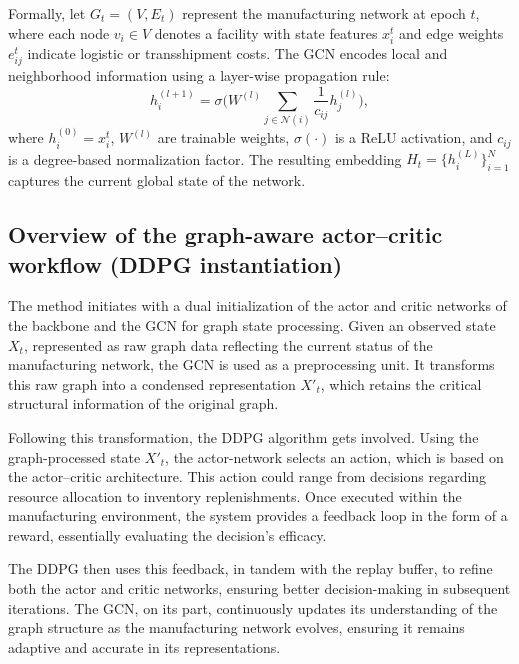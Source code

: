 \documentclass[preprint,review,12pt,nonatbib]{elsarticle}
\providecommand{\DIFadd}[1]{{\protect\color{blue}#1}} %
\providecommand{\DIFdel}[1]{} %
\providecommand{\DIFaddbegin}{} %
\providecommand{\DIFaddend}{} %
\providecommand{\DIFdelbegin}{} %
\providecommand{\DIFdelend}{} %
\providecommand{\DIFscaledelfig}{0.5}
\newlength{\DIFdelgraphicswidth} %
\newlength{\DIFdelgraphicsheight} %
\providecommand{\DIFaddincludegraphics}[2][]{{\color{blue}\fbox{\DIFOincludegraphics[#1]{#2}}}} %
\providecommand{\DIFdelincludegraphics}[2][]{%
\sbox{\DIFdelgraphicsbox}{\DIFOincludegraphics[#1]{#2}}%
\settoboxwidth{\DIFdelgraphicswidth}{\DIFdelgraphicsbox} %
\settoboxtotalheight{\DIFdelgraphicsheight}{\DIFdelgraphicsbox} %
\scalebox{\DIFscaledelfig}{%
\parbox[b]{\DIFdelgraphicswidth}{\usebox{\DIFdelgraphicsbox}\\[-\baselineskip] \rule{\DIFdelgraphicswidth}{0em}}\llap{\resizebox{\DIFdelgraphicswidth}{\DIFdelgraphicsheight}{%
\setlength{\unitlength}{\DIFdelgraphicswidth}%
\begin{picture}(1,1)%
\thicklines\linethickness{2pt} %
{\color[rgb]{1,0,0}\put(0,0){\framebox(1,1){}}}%
{\color[rgb]{1,0,0}\put(0,0){\line( 1,1){1}}}%
{\color[rgb]{1,0,0}\put(0,1){\line(1,-1){1}}}%
\end{picture}%
}\hspace*{3pt}}} %
} %
\DeclareRobustCommand{\DIFaddbegin}{\DIFOaddbegin \let\includegraphics\DIFaddincludegraphics} %
\DeclareRobustCommand{\DIFaddend}{\DIFOaddend \let\includegraphics\DIFOincludegraphics} %
\DeclareRobustCommand{\DIFdelbegin}{\DIFOdelbegin \let\includegraphics\DIFdelincludegraphics} %
\DeclareRobustCommand{\DIFdelend}{\DIFOaddend \let\includegraphics\DIFOincludegraphics} %
\begin{document}
Formally, let $G_t=(V,E_t)$ represent the manufacturing network at epoch $t$, where each node
$v_i\in V$ denotes a facility with state features $x_i^t$ and edge weights $e_{ij}^t$ indicate
logistic or transshipment costs. The GCN encodes local and neighborhood information using a
layer-wise propagation rule:
\begin{equation}
h_i^{(l+1)} = \sigma \Big(W^{(l)} \sum_{j \in \mathcal{N}(i)} \frac{1}{c_{ij}} h_j^{(l)} \Big),
\end{equation}
where $h_i^{(0)} = x_i^t$, $W^{(l)}$ are trainable weights, $\sigma(\cdot)$ is a ReLU activation,
and $c_{ij}$ is a degree-based normalization factor. The resulting embedding
$H_t = \{h_i^{(L)}\}_{i=1}^{N}$ captures the current global state of the network.
\subsection*{Overview of the \DIFdelbegin \DIFdel{DDPG-GCN Workflow}\DIFdelend \DIFaddbegin \DIFadd{graph-aware actor--critic workflow (DDPG instantiation)}\DIFaddend }

The method initiates with a dual initialization \DIFdelbegin \DIFdel{: the DDPG's }\DIFdelend \DIFaddbegin \DIFadd{of the }\DIFaddend actor and critic networks \DIFaddbegin \DIFadd{of the backbone }\DIFaddend and the GCN for graph state processing. Given an observed state \( X_t \), represented as raw graph data reflecting the current status of the manufacturing network, the GCN is used as a preprocessing unit. It transforms this raw graph into a condensed representation \( X'_t \), which retains the critical structural information of the original graph.

Following this transformation, the DDPG algorithm gets involved. Using the graph-processed state \( X'_t \), the actor-network selects an action, which is based on the actor--critic architecture. This action could range from decisions regarding resource allocation to inventory replenishments. Once executed within the manufacturing environment, the system provides a feedback loop in the form of a reward, essentially evaluating the decision's efficacy.

The DDPG then uses this feedback, in tandem with the replay buffer, to refine both the actor and critic networks, ensuring better decision-making in subsequent iterations. The GCN, on its part, continuously updates its understanding of the graph structure as the manufacturing network evolves, ensuring it remains adaptive and accurate in its representations.
\end{document}
